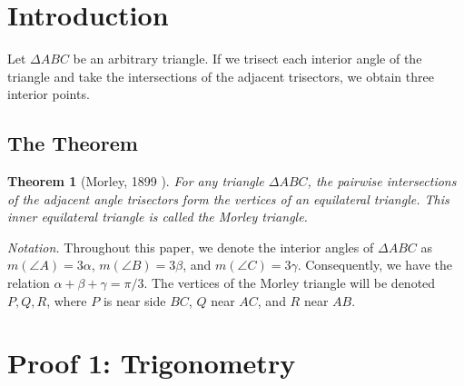 \documentclass{amsart}
\newtheorem{theorem}{Theorem}[section]
\begin{document}
	\newpage
	\tableofcontents
	
	\newpage
	\renewcommand{\listfigurename}{\centering \Large LIST OF FIGURES}
	\listoffigures
	\newpage
	
	
	\section{Introduction}
	
	Let $\Delta ABC$ be an arbitrary triangle. If we trisect each interior angle of the triangle and take the intersections of the adjacent trisectors, we obtain three interior points. 
	
	\subsection{The Theorem}
	\begin{theorem}[Morley, 1899 \cite{morley1900}]
		For any triangle $\Delta ABC$, the pairwise intersections of the adjacent angle trisectors form the vertices of an equilateral triangle. This inner equilateral triangle is called the Morley triangle.
	\end{theorem}
	
	\noindent \textit{Notation.} Throughout this paper, we denote the interior angles of $\Delta ABC$ as $m(\angle A) = 3\alpha$, $m(\angle B) = 3\beta$, and $m(\angle C) = 3\gamma$. Consequently, we have the relation $\alpha + \beta + \gamma = \pi/3$. The vertices of the Morley triangle will be denoted $P, Q, R$, where $P$ is near side $BC$, $Q$ near $AC$, and $R$ near $AB$.
	
	\section{Proof 1: Trigonometry}
	
\end{document}
